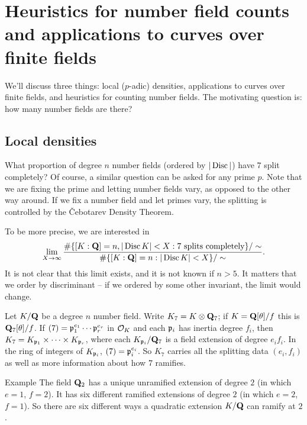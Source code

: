 
\section{Heuristics for number field counts and applications to curves over finite fields}\label{sec:wood-iv}





We'll discuss three things: local ($p$-adic) densities, applications to curves 
over finite fields, and heuristics for counting number fields. 
The motivating question is: how many number fields are there? 





\subsection{Local densities}

What proportion of degree $n$ number fields (ordered by $|\operatorname{Disc}|$) have 
$7$ split completely? Of course, a similar question can be asked for any prime 
$p$. Note that we are fixing the prime and letting number fields vary, as 
opposed to the other way around. If we fix a number field and let primes 
vary, the splitting is controlled by the \v Cebotarev Density Theorem. 

To be more precise, we are interested in 
\[
  \lim_{X\to \infty} \frac{\#\{[K:\mathbf{Q}]=n,|\operatorname{Disc} K|<X:7\text{ splits completely}\}/\sim}{\#\{[K:\mathbf{Q}]=n:|\operatorname{Disc} K|<X\}/\sim} .
\]
It is not clear that this limit exists, and it is not known if $n>5$. It 
matters that we order by discriminant -- if we ordered by some other invariant, 
the limit would change. 

Let $K/\mathbf{Q}$ be a degree $n$ number field. Write $K_7=K\otimes \mathbf{Q}_7$; if 
$K=\mathbf{Q}[\theta]/f$ this is $\mathbf{Q}_7[\theta]/f$. If 
$(7)=\mathfrak{p}_1^{e_1}\cdots \mathfrak{p}_r^{e_r}$ in $\mathcal{O}_K$ and each $\mathfrak{p}_i$ has inertia 
degree $f_i$, then $K_7=K_{\mathfrak{p}_1}\times \cdots \times K_{\mathfrak{p}_r}$, where each 
$K_{\mathfrak{p}_i}/\mathbf{Q}_7$ is a field extension of degree $e_i f_i$. In the ring of 
integers of $K_{\mathfrak{p}_i}$, $(7)=\mathfrak{p}_i^{e_i}$. So $K_7$ carries all the splitting 
data $(e_i,f_i)$ as well as more information about how $7$ ramifies. 

\begin{enonce}[remark]{Example}
The field $\mathbf{Q}_2$ has a unique unramified extension of degree $2$ (in which 
$e=1$, $f=2$). It has six different ramified extensions of degree $2$ (in 
which $e=2$, $f=1$). So there are six different ways a quadratic extension 
$K/\mathbf{Q}$ can ramify at $2$. 
\end{enonce}

